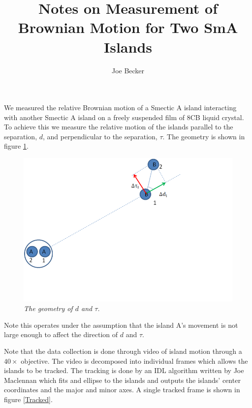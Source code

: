 \documentclass[11pt]{article}
\title{Notes on Measurement of Brownian Motion for Two SmA Islands}
\author{Joe Becker}
\begin{document}
\maketitle

We measured the relative Brownian motion of a Smectic A island interacting with another Smectic A island on a freely suspended film of 8CB liquid crystal. To achieve this we measure the relative motion of the islands parallel to the separation, $d$, and perpendicular to the separation, $\tau$. The geometry is shown in figure \ref{DTauFig}.

\begin{figure}
\centering
\includegraphics[scale=0.4]{Images/DTauFigure.png}
\caption{\textit{The geometry of $d$ and $\tau$.}}
\label{DTauFig}
\end{figure}

Note this operates under the assumption that the island A's movement is not large enough to affect the direction of $d$ and $\tau$. 

Note that the data collection is done through video of island motion through a $40\times$ objective. The video is decomposed into individual frames which allows the islands to be tracked. The tracking is done by an IDL algorithm written by Joe Maclennan which fits and ellipse to the islands and outputs the islands' center coordinates and the major and minor axes. A single tracked frame is shown in figure \ref{Tracked}.
\end{document}
